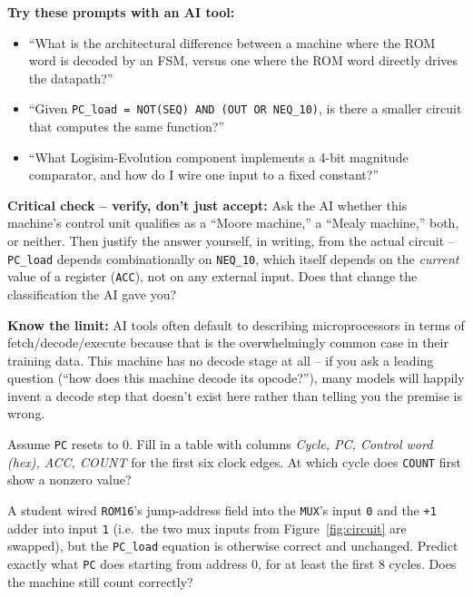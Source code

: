 \documentclass[11pt]{article}
\begin{document}
\begin{aicollab}
\textbf{Try these prompts with an AI tool:}
\begin{itemize}[leftmargin=*,nosep]
  \item ``What is the architectural difference between a machine where the ROM
        word is decoded by an FSM, versus one where the ROM word directly drives
        the datapath?''
  \item ``Given \texttt{PC\_load = NOT(SEQ) AND (OUT OR NEQ\_10)}, is there a
        smaller circuit that computes the same function?''
  \item ``What Logisim-Evolution component implements a 4-bit magnitude
        comparator, and how do I wire one input to a fixed constant?''
\end{itemize}

\medskip\textbf{Critical check -- verify, don't just accept:}
Ask the AI whether this machine's control unit qualifies as a ``Moore machine,''
a ``Mealy machine,'' both, or neither. Then justify the answer yourself, in
writing, from the actual circuit -- \texttt{PC\_load} depends combinationally on
\texttt{NEQ\_10}, which itself depends on the \emph{current} value of a register
(\texttt{ACC}), not on any external input. Does that change the classification
the AI gave you?

\medskip\textbf{Know the limit:}
AI tools often default to describing microprocessors in terms of
fetch/decode/execute because that is the overwhelmingly common case in their
training data. This machine has no decode stage at all -- if you ask a leading
question (``how does this machine decode its opcode?''), many models will
happily invent a decode step that doesn't exist here rather than telling you the
premise is wrong.
\end{aicollab}

\takehomebanner

\begin{trace}
Assume \texttt{PC} resets to 0. Fill in a table with columns \emph{Cycle, PC,
Control word (hex), ACC, COUNT} for the first six clock edges. At which cycle
does \texttt{COUNT} first show a nonzero value?
\end{trace}

\begin{bug}
A student wired \texttt{ROM16}'s jump-address field into the \texttt{MUX}'s
input \texttt{0} and the \texttt{+1} adder into input \texttt{1} (i.e.\ the two
mux inputs from Figure~\ref{fig:circuit} are swapped), but the \texttt{PC\_load}
equation is otherwise correct and unchanged. Predict exactly what \texttt{PC}
does starting from address 0, for at least the first 8 cycles. Does the machine
still count correctly?
\end{bug}
\end{document}
